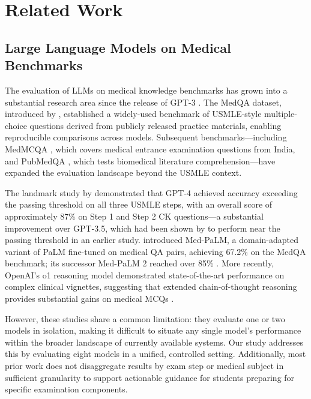 \section{Related Work}

\subsection{Large Language Models on Medical Benchmarks}

The evaluation of LLMs on medical knowledge benchmarks has grown into a substantial research area since the release of GPT-3 \parencite{brown2020gpt3}. The MedQA dataset, introduced by \textcite{jin2021medqa}, established a widely-used benchmark of USMLE-style multiple-choice questions derived from publicly released practice materials, enabling reproducible comparisons across models. Subsequent benchmarks—including MedMCQA \parencite{pal2022medmcqa}, which covers medical entrance examination questions from India, and PubMedQA \parencite{jin2019pubmedqa}, which tests biomedical literature comprehension—have expanded the evaluation landscape beyond the USMLE context.

The landmark study by \textcite{nori2023gpt4usmle} demonstrated that GPT-4 achieved accuracy exceeding the passing threshold on all three USMLE steps, with an overall score of approximately 87\% on Step 1 and Step 2 CK questions—a substantial improvement over GPT-3.5, which had been shown by \textcite{kung2023chatgptusmle} to perform near the passing threshold in an earlier study. \textcite{singhal2023medpalm} introduced Med-PaLM, a domain-adapted variant of PaLM fine-tuned on medical QA pairs, achieving 67.2\% on the MedQA benchmark; its successor Med-PaLM 2 reached over 85\% \parencite{singhal2023medpalm2}. More recently, OpenAI's o1 reasoning model demonstrated state-of-the-art performance on complex clinical vignettes, suggesting that extended chain-of-thought reasoning provides substantial gains on medical MCQs \parencite{openai2024o1}.

However, these studies share a common limitation: they evaluate one or two models in isolation, making it difficult to situate any single model's performance within the broader landscape of currently available systems. Our study addresses this by evaluating eight models in a unified, controlled setting. Additionally, most prior work does not disaggregate results by exam step or medical subject in sufficient granularity to support actionable guidance for students preparing for specific examination components.


